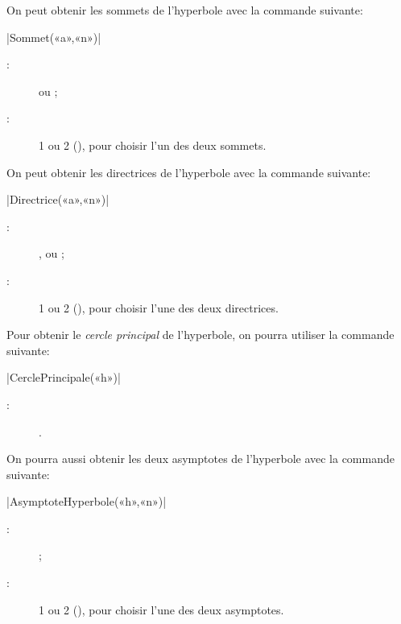 \documentclass[a4paper,french]{article}
\begin{document}
On peut obtenir les sommets de l'hyperbole avec la commande suivante:

\begin{colourband}
\macro|Sommet(«a»,«n»)|
\begin{description}
  \item[:]   ou  ;
  \item[:]  1 ou 2 (), pour choisir l'un des deux sommets.
\end{description}
\end{colourband}
\bigskip

On peut obtenir les directrices de l'hyperbole avec la commande suivante:

\begin{colourband}
\macro|Directrice(«a»,«n»)|
\begin{description}
  \item[:]  ,  ou 
  ; 
  \item[:]  1 ou 2 (), pour choisir l'une des deux
  directrices. 
\end{description}
\end{colourband}
\bigskip

Pour obtenir le \emph{cercle principal} de l'hyperbole, on pourra utiliser la
commande suivante:


\begin{colourband}
  \macro|CerclePrincipale(«h»)|
  \begin{description}
    \item[:]  .
  \end{description}
\end{colourband}
\bigskip

On pourra aussi obtenir les deux asymptotes de l'hyperbole avec la commande
suivante:

\begin{colourband}
  \macro|AsymptoteHyperbole(«h»,«n»)|
  \begin{description}
    \item[:]   ;
    \item[:]  1 ou 2 (), pour choisir l'une des deux
    asymptotes. 
  \end{description}
\end{colourband}
\bigskip
\end{document}
